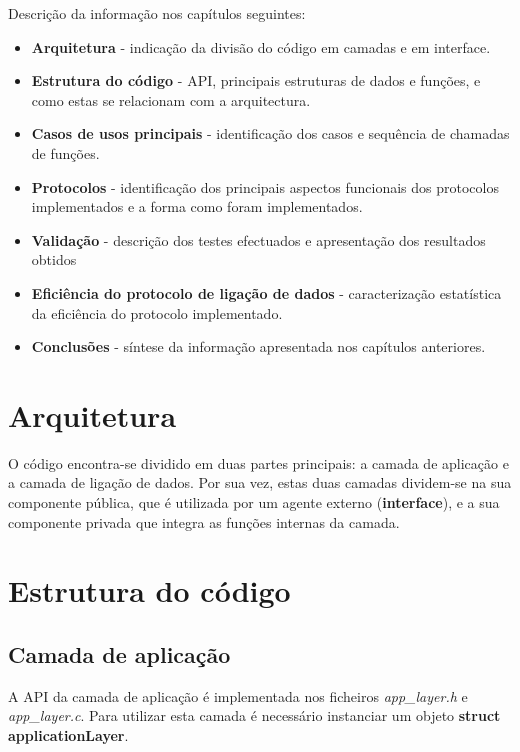 \documentclass[11pt]{report}
\begin{document}
Descrição da informação nos capítulos seguintes:
\begin{itemize}
  \item \textbf{Arquitetura} - indicação da divisão do código em camadas e em
    interface.
  \item \textbf{Estrutura do código} - API, principais estruturas de dados e
    funções, e como estas se relacionam com a arquitectura.
  \item \textbf{Casos de usos principais} - identificação dos casos e sequência
    de chamadas de funções.
  \item \textbf{Protocolos} - identificação dos principais aspectos funcionais
    dos protocolos implementados e a forma como foram implementados.
  \item \textbf{Validação} - descrição dos testes efectuados e apresentação dos
    resultados obtidos
  \item \textbf{Eficiência do protocolo de ligação de dados} - caracterização
    estatística da eficiência do protocolo implementado.
  \item \textbf{Conclusões} - síntese da informação apresentada nos capítulos
    anteriores.
\end{itemize}

{\let\clearpage\relax \chapter{Arquitetura}}

O código encontra-se dividido em duas partes principais: a camada de aplicação e
a camada de ligação de dados. Por sua vez, estas duas camadas dividem-se na sua
componente pública, que é utilizada por um agente externo (\textbf{interface}), e a sua
componente privada que integra as funções internas da camada.

{\let\clearpage\relax \chapter{Estrutura do código}}

\section{Camada de aplicação}

A API da camada de aplicação é implementada nos ficheiros \textit{app\_layer.h}
e \textit{app\_layer.c}. Para utilizar esta camada é necessário instanciar um objeto
\textbf{struct applicationLayer}.
\end{document}
